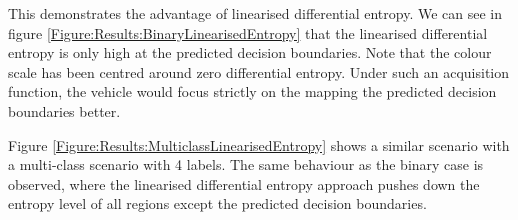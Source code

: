 \documentclass{article}
\begin{document}
		
%		
		
		This demonstrates the advantage of linearised differential entropy. We can see in figure \ref{Figure:Results:BinaryLinearisedEntropy} that the linearised differential entropy is only high at the predicted decision boundaries. Note that the colour scale has been centred around zero differential entropy. Under such an acquisition function, the vehicle would focus strictly on the mapping the predicted decision boundaries better.
		
		Figure \ref{Figure:Results:MulticlassLinearisedEntropy} shows a similar scenario with a multi-class scenario with 4 labels. The same behaviour as the binary case is observed, where the linearised differential entropy approach pushes down the entropy level of all regions except the predicted decision boundaries.
	
\end{document}
